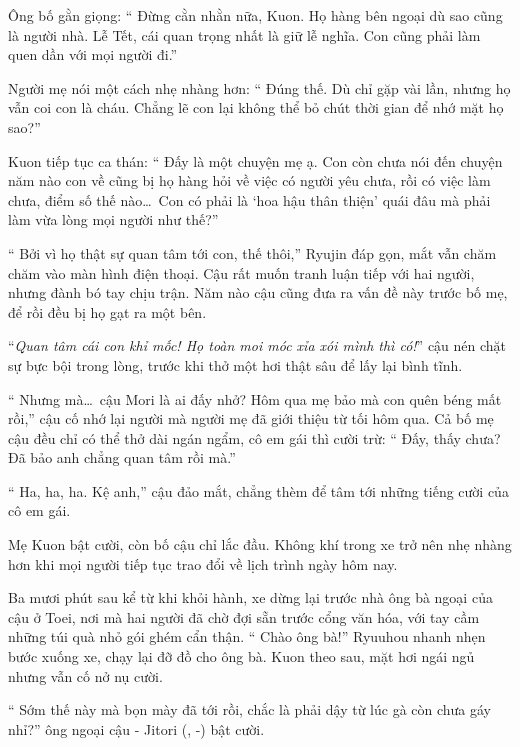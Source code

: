 \documentclass[../main.tex]{subfiles}
\begin{document}
Ông bố gằn giọng: ``{\color{red} Đừng cằn nhằn nữa, Kuon. Họ hàng bên ngoại dù sao cũng là người nhà. Lễ Tết, cái quan trọng nhất là giữ lễ nghĩa. Con cũng phải làm quen dần với mọi người đi.}''

Người mẹ nói một cách nhẹ nhàng hơn: ``{\color{red} Đúng thế. Dù chỉ gặp vài lần, nhưng họ vẫn coi con là cháu. Chẳng lẽ con lại không thể bỏ chút thời gian để nhớ mặt họ sao?}''

Kuon tiếp tục ca thán: ``{\color{red} Đấy là một chuyện mẹ ạ. Con còn chưa nói đến chuyện năm nào con về cũng bị họ hàng hỏi về việc có người yêu chưa, rồi có việc làm chưa, điểm số thế nào\dots\ Con có phải là `hoa hậu thân thiện' quái đâu mà phải làm vừa lòng mọi người như thế?}''

``{\color{red} Bởi vì họ thật sự quan tâm tới con, thế thôi,}'' Ryujin đáp gọn, mắt vẫn chăm chăm vào màn hình điện thoại. Cậu rất muốn tranh luận tiếp với hai người, nhưng đành bó tay chịu trận. Năm nào cậu cũng đưa ra vấn đề này trước bố mẹ, để rồi đều bị họ gạt ra một bên.

``\textit{Quan tâm cái con khỉ mốc! Họ toàn moi móc xỉa xói mình thì có!}'' cậu nén chặt sự bực bội trong lòng, trước khi thở một hơi thật sâu để lấy lại bình tĩnh.

``{\color{red} Nhưng mà\dots\ cậu Mori là ai đấy nhở? Hôm qua mẹ bảo mà con quên béng mất rồi,}'' cậu cố nhớ lại người mà người mẹ đã giới thiệu từ tối hôm qua. Cả bố mẹ cậu đều chỉ có thể thở dài ngán ngẩm, cô em gái thì cười trừ: ``{\color{red} Đấy, thấy chưa? Đã bảo anh chẳng quan tâm rồi mà.}''

``{\color{red} Ha, ha, ha. Kệ anh,}'' cậu đảo mắt, chẳng thèm để tâm tới những tiếng cười của cô em gái.

Mẹ Kuon bật cười, còn bố cậu chỉ lắc đầu. Không khí trong xe trở nên nhẹ nhàng hơn khi mọi người tiếp tục trao đổi về lịch trình ngày hôm nay.

\ct

Ba mươi phút sau kể từ khi khỏi hành, xe dừng lại trước nhà ông bà ngoại của cậu ở Toei, nơi mà hai người đã chờ đợi sẵn trước cổng văn hóa, với tay cầm những túi quà nhỏ gói ghém cẩn thận. ``{\color{red} Chào ông bà!}'' Ryuuhou nhanh nhẹn bước xuống xe, chạy lại đỡ đồ cho ông bà. Kuon theo sau, mặt hơi ngái ngủ nhưng vẫn cố nở nụ cười.

``{\color{red} Sớm thế này mà bọn mày đã tới rồi, chắc là phải dậy từ lúc gà còn chưa gáy nhỉ?}'' ông ngoại cậu - Jitori (, -) bật cười.
\end{document}
